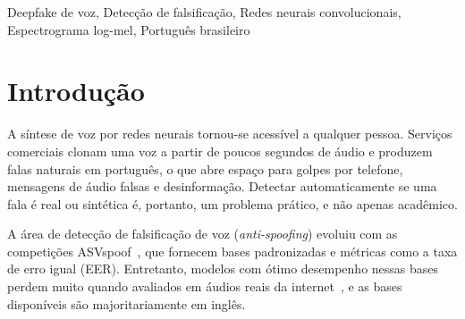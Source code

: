 \begin{frontmatter}
\begin{abstract}
\medskip
\textbf{Abstract.~}
\noindent Commercial voice-cloning tools such as ElevenLabs produce synthetic speech that is hard to tell apart from real speech, and detectors trained only on academic corpora often fail on it. This work presents a Brazilian Portuguese voice deepfake detector based on a convolutional neural network (CNN) trained from scratch on log-mel spectrograms. Training combines fakes from 16 MLAAD synthesizers, commercial fakes (ElevenLabs, Amazon Polly, Microsoft Edge TTS, Google TTS, among others) and real speech from CORAA-MUPE and Common Voice, with languages balanced across classes. To make the model work on everyday recordings, every example goes through lossy codecs, a chain that mimics WhatsApp forwarding, and channel degradations, applied equally to both classes. The final model, an ensemble of two residual CNNs with 501,953 parameters each, trained on Google Colab, reached an EER of 1.75\% on the clean test set, 6.5\% on the degraded test set and 1.25\% on synthesizers never seen in training. On a blind test with audio recorded and generated by the authors, it detected 13 of 16 fakes and classified all 9 real recordings correctly. The results were reproduced on a Mac mini M4, with EER differences of up to 1.8 points. Performance on audio collected from the internet (In-the-Wild, 30.6\% EER) shows the current limit of the approach.
\end{abstract}

\begin{keywords}
Deepfake de voz, Detecção de falsificação, Redes neurais convolucionais, Espectrograma log-mel, Português brasileiro
\end{keywords}

\end{frontmatter}


\section{Introdução}
\label{sec:intro}

A síntese de voz por redes neurais tornou-se acessível a qualquer pessoa. Serviços comerciais clonam uma voz a partir de poucos segundos de áudio e produzem falas naturais em português, o que abre espaço para golpes por telefone, mensagens de áudio falsas e desinformação. Detectar automaticamente se uma fala é real ou sintética é, portanto, um problema prático, e não apenas acadêmico.

A área de detecção de falsificação de voz (\textit{anti-spoofing}) evoluiu com as competições ASVspoof~\citep{todisco2019asvspoof,liu2023asvspoof2021}, que fornecem bases padronizadas e métricas como a taxa de erro igual (EER). Entretanto, modelos com ótimo desempenho nessas bases perdem muito quando avaliados em áudios reais da internet~\citep{muller2022itw}, e as bases disponíveis são majoritariamente em inglês.

